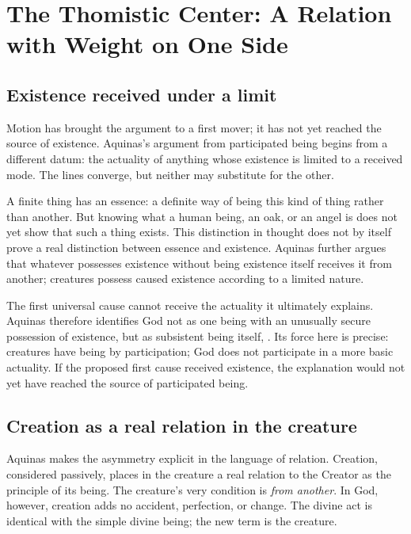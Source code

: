 \section{The Thomistic Center: A Relation with Weight on One Side}

\subsection{Existence received under a limit}

Motion has brought the argument to a first mover; it has not yet reached the source of existence. Aquinas's argument from participated being begins from a different datum: the actuality of anything whose existence is limited to a received mode. The lines converge, but neither may substitute for the other.

A finite thing has an essence: a definite way of being this kind of thing rather than another. But knowing what a human being, an oak, or an angel is does not yet show that such a thing exists. This distinction in thought does not by itself prove a real distinction between essence and existence. Aquinas further argues that whatever possesses existence without being existence itself receives it from another; creatures possess caused existence according to a limited nature.

The first universal cause cannot receive the actuality it ultimately explains. Aquinas therefore identifies God not as one being with an unusually secure possession of existence, but as subsistent being itself, . Its force here is precise: creatures have being by participation; God does not participate in a more basic actuality. If the proposed first cause received existence, the explanation would not yet have reached the source of participated being.

\subsection{Creation as a real relation in the creature}

Aquinas makes the asymmetry explicit in the language of relation. Creation, considered passively, places in the creature a real relation to the Creator as the principle of its being. The creature's very condition is \emph{from another}. In God, however, creation adds no accident, perfection, or change. The divine act is identical with the simple divine being; the new term is the creature.

